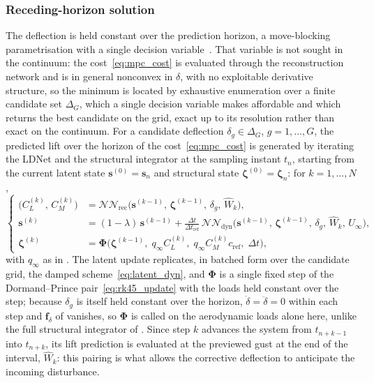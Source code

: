 \subsubsection{Receding-horizon solution}
\label{subsubsec:mpc_solution}

The deflection is held constant over the prediction horizon, a move-blocking parametrisation with a single decision variable~\cite{rawlings2017mpc}. That variable is not sought in the continuum: the cost~\eqref{eq:mpc_cost} is evaluated through the reconstruction network and is in general nonconvex in $\delta$, with no exploitable derivative structure, so the minimum is located by exhaustive enumeration over a finite candidate set $\Delta_G$, which a single decision variable makes affordable and which returns the best candidate on the grid, exact up to its resolution rather than exact on the continuum. For a candidate deflection $\delta_g \in \Delta_G$, $g = 1,\dots,G$, the predicted lift over the horizon of the cost~\eqref{eq:mpc_cost} is generated by iterating the LDNet and the structural integrator at the sampling instant $t_n$, starting from the current latent state $\mathbf{s}^{(0)} = \mathbf{s}_n$ and structural state $\boldsymbol{\zeta}^{(0)} = \boldsymbol{\zeta}_n$: for $k = 1,\dots,N$,
\begin{equation}
\left\{
\begin{aligned}
\bigl(C_L^{(k)},\, C_M^{(k)}\bigr) &= \mathcal{N}\mathcal{N}_{\text{rec}}\bigl(\mathbf{s}^{(k-1)},\, \boldsymbol{\zeta}^{(k-1)},\, \delta_g,\, \widehat{W}_k\bigr),\\[2pt]
\mathbf{s}^{(k)} &= (1-\lambda)\,\mathbf{s}^{(k-1)} + \frac{\Delta t}{\Delta t_{\mathrm{ref}}}\,
\mathcal{N}\mathcal{N}_{\text{dyn}}\bigl(\mathbf{s}^{(k-1)},\, \boldsymbol{\zeta}^{(k-1)},\, \delta_g,\, \widehat{W}_k,\, U_\infty\bigr),\\[2pt]
\boldsymbol{\zeta}^{(k)} &= \boldsymbol{\Phi}\bigl(\boldsymbol{\zeta}^{(k-1)},\; q_\infty C_L^{(k)},\; q_\infty C_M^{(k)} c_{\mathrm{ref}},\; \Delta t\bigr),
\end{aligned}
\right.
\label{eq:mpc_recursion}
\end{equation}
with $q_\infty$ as in . The latent update replicates, in batched form over the candidate grid, the damped scheme~\eqref{eq:latent_dyn}, and $\boldsymbol{\Phi}$ is a single fixed step of the Dormand--Prince pair~\eqref{eq:rk45_update} with the loads held constant over the step; because $\delta_g$ is itself held constant over the horizon, $\dot\delta=\ddot\delta=0$ within each step and $\mathbf{f}_\delta$ of  vanishes, so $\boldsymbol{\Phi}$ is called on the aerodynamic loads alone here, unlike the full structural integrator of . Since step $k$ advances the system from $t_{n+k-1}$ into $t_{n+k}$, its lift prediction is evaluated at the previewed gust at the end of the interval, $\widehat{W}_k$: this pairing is what allows the corrective deflection to anticipate the incoming disturbance.

